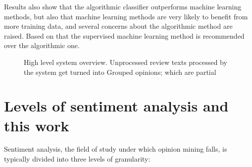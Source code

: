 \documentclass[a4paper,11pt]{kth-mag}
\begin{document}
Results also show that the algorithmic classifier outperforms machine learning methods,
but also that machine learning methods are very likely to benefit from more training data,
and several concerns about the algorithmic method are raised.
Based on that the supervised machine learning method is recommended over the algorithmic one.


\begin{figure}[t]
  \centering
  \caption{High level system overview. Unprocessed review texts processed by the system
    get turned into Grouped opinions; which are partial }
  \label{fig:overview}
\end{figure}



\clearpage

\newpage
\section{Levels of sentiment analysis and this work}
Sentiment analysis, the field of study under which opinion mining falls,
is typically divided into three levels of granularity:
\end{document}
